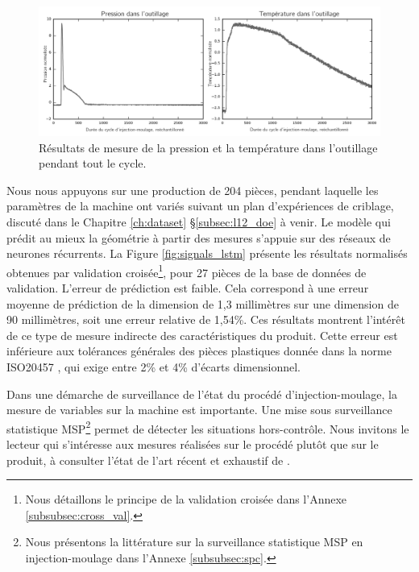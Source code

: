 \begin{figure}[bthp]
	\centering
	\includegraphics[width=\textwidth]{../Chap2/Figures/part1_std_signals.png}
	\caption{Résultats de mesure de la pression et la température dans l'outillage pendant tout le cycle.}
	\label{fig:inmold_signals}
\end{figure}

Nous nous appuyons sur une production de 204 pièces, pendant laquelle les paramètres de la machine ont variés suivant un plan d'expériences de criblage, discuté dans le Chapitre \ref{ch:dataset} §\ref{subsec:l12_doe} à venir.
Le modèle qui prédit au mieux la géométrie à partir des mesures s'appuie sur des réseaux de neurones récurrents. %
La Figure \ref{fig:signals_lstm} présente les résultats normalisés obtenues par validation croisée\footnote{Nous détaillons le principe de la validation croisée dans l'Annexe \ref{subsubsec:cross_val}.}, pour 27 pièces de la base de données de validation.
L'erreur de prédiction est faible.
Cela correspond à une erreur moyenne de prédiction de la dimension de 1,3 millimètres sur une dimension de 90 millimètres, soit une erreur relative de 1,54\%.
Ces résultats montrent l'intérêt de ce type de mesure indirecte des caractéristiques du produit.
Cette erreur est inférieure aux tolérances générales des pièces plastiques donnée dans la norme ISO20457 \cite{ISO_20457_2018}, qui exige entre 2\% et 4\% d'écarts dimensionnel.

Dans une démarche de surveillance de l'état du procédé d'injection-moulage, la mesure de variables sur la machine est importante.
Une mise sous surveillance statistique MSP\footnote{Nous présentons la littérature sur la surveillance statistique MSP en injection-moulage dans l'Annexe \ref{subsubsec:spc}.} permet de détecter les situations hors-contrôle.
Nous invitons le lecteur qui s'intéresse aux mesures réalisées sur le procédé plutôt que sur le produit, à consulter l'état de l'art récent et exhaustif de \citeauthor{ageyeva_inmold_2019} \cite{ageyeva_inmold_2019}.

